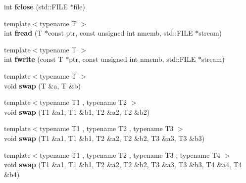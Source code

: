 \begin{DoxyCompactItemize}
\item 
\hypertarget{namespacecimg__library_1_1cimg_ae54f76e8c2bcff93277e9cae1906a3d6}{int {\bfseries fclose} (std\-::\-F\-I\-L\-E $\ast$file)}\label{namespacecimg__library_1_1cimg_ae54f76e8c2bcff93277e9cae1906a3d6}

\item 
\hypertarget{namespacecimg__library_1_1cimg_a4429d578e86edc9147af5a8f307c5f30}{{\footnotesize template$<$typename T $>$ }\\int {\bfseries fread} (T $\ast$const ptr, const unsigned int nmemb, std\-::\-F\-I\-L\-E $\ast$stream)}\label{namespacecimg__library_1_1cimg_a4429d578e86edc9147af5a8f307c5f30}

\item 
\hypertarget{namespacecimg__library_1_1cimg_afbc8d43d7f8c482392873aeeb2c4d9a5}{{\footnotesize template$<$typename T $>$ }\\int {\bfseries fwrite} (const T $\ast$ptr, const unsigned int nmemb, std\-::\-F\-I\-L\-E $\ast$stream)}\label{namespacecimg__library_1_1cimg_afbc8d43d7f8c482392873aeeb2c4d9a5}

\item 
\hypertarget{namespacecimg__library_1_1cimg_a4fd51e3f76da1f8123c19b69160accfb}{{\footnotesize template$<$typename T $>$ }\\void {\bfseries swap} (T \&a, T \&b)}\label{namespacecimg__library_1_1cimg_a4fd51e3f76da1f8123c19b69160accfb}

\item 
\hypertarget{namespacecimg__library_1_1cimg_a709ae26dc7ea3e6a63d211a762541181}{{\footnotesize template$<$typename T1 , typename T2 $>$ }\\void {\bfseries swap} (T1 \&a1, T1 \&b1, T2 \&a2, T2 \&b2)}\label{namespacecimg__library_1_1cimg_a709ae26dc7ea3e6a63d211a762541181}

\item 
\hypertarget{namespacecimg__library_1_1cimg_a9b1a168d5c9f32b811a11da56f2692c9}{{\footnotesize template$<$typename T1 , typename T2 , typename T3 $>$ }\\void {\bfseries swap} (T1 \&a1, T1 \&b1, T2 \&a2, T2 \&b2, T3 \&a3, T3 \&b3)}\label{namespacecimg__library_1_1cimg_a9b1a168d5c9f32b811a11da56f2692c9}

\item 
\hypertarget{namespacecimg__library_1_1cimg_a0ae9ba4b242f8266ef10c276c82724c7}{{\footnotesize template$<$typename T1 , typename T2 , typename T3 , typename T4 $>$ }\\void {\bfseries swap} (T1 \&a1, T1 \&b1, T2 \&a2, T2 \&b2, T3 \&a3, T3 \&b3, T4 \&a4, T4 \&b4)}\label{namespacecimg__library_1_1cimg_a0ae9ba4b242f8266ef10c276c82724c7}


\end{DoxyCompactItemize}
